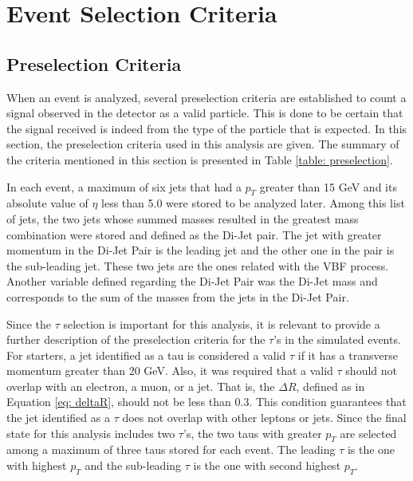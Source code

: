 \graphicspath{{SelectionCriteria/Figures/}}

\chapter{Event Selection Criteria}

\section{Preselection Criteria}\label{sec: preselectionCriteria}

When an event is analyzed, several preselection criteria are established to count a signal observed in the detector as a valid particle. This is done to be certain that the signal received is indeed from the type of the particle that is expected. In this section, the preselection criteria used in this analysis are given. The summary of the criteria mentioned in this section is presented in Table \ref{table: preselection}. 

In each event, a maximum of six jets that had a $p_{T}$ greater than 15 GeV and its absolute value of $\eta$ less than 5.0 were stored to be analyzed later. Among this list of jets, the two jets whose summed masses resulted in the greatest mass combination were stored and defined as the Di-Jet pair. The jet with greater momentum in the Di-Jet Pair is the leading jet and the other one in the pair is the sub-leading jet. These two jets are the ones related with the VBF process. Another variable defined regarding the Di-Jet Pair was the Di-Jet mass and corresponds to the sum of the masses from the jets in the Di-Jet Pair.  

Since the $\tau$ selection is important for this analysis, it is relevant to provide a further description of the preselection criteria for the $\tau$'s in the simulated events. For starters, a jet identified as a tau is considered a valid $\tau$ if it has a transverse momentum greater than 20 GeV. Also, it was required that a valid $\tau$ should not overlap with an electron, a muon, or a jet. That is, the $\Delta R$, defined as in Equation \ref{eq: deltaR}, should not be less than 0.3. This condition guarantees that the jet identified as a $\tau$ does not overlap with other leptons or jets. Since the final state for this analysis includes two $\tau$'s, the two taus with greater $p_{T}$ are selected among a maximum of three taus stored for each event. The leading $\tau$ is the one with highest $p_{T}$ and the sub-leading $\tau$ is the one with second highest $p_{T}$.

